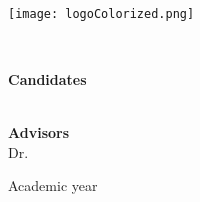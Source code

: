 \begin{center}
    \begin{spacing}{2} %
       \textbf{\large {\University}}\\
    \end{spacing}
    
    \vspace{0.5cm}

    \texttt{[image: logoColorized.png]}
    
    \begin{spacing}{1.5} %
      \textbf{\large {\Course}}\\
    \end{spacing}

    \vspace{2cm} %

    \begin{spacing}{2.4} %
      \textbf{\LARGE {\thesisTitle}}
    \end{spacing}
  
    \vspace{2cm} %
  
    \begin{spacing}{1.5} %
      \textbf{\large {Candidates}}\\
      {\large \thesisAuthor}\\
    \end{spacing}

    \vspace{0.5cm} %

    \begin{spacing}{1.5} %
      \textbf {\large {Advisors}} \\
      {\large {Dr. \supervisor}}\\
    \end{spacing}

    \vfill
    \begin{center}
      {\large Academic year \thesisDate}
    \end{center}
\end{center}